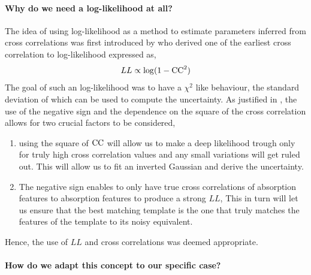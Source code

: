 \paragraph{Why do we need a log-likelihood at all?\\}
The idea of using log-likelihood as a method to estimate parameters inferred from cross correlations was first introduced by \cite{2003Zucker} who derived one of the earliest cross correlation to log-likelihood expressed as,
\begin{equation}
    LL \propto \log(1-\rm{CC}^2)
    \label{eq:LL-cc eqn}
\end{equation}
The goal of such an log-likelihood was to have a $\chi^2$ like behaviour, the standard deviation of which can be used to compute the uncertainty.
As justified in \cite{2019Brogi}, the use of the negative sign and the dependence on the square of the cross correlation allows for two crucial factors to be considered,
\begin{enumerate}
\item using the square of $\rm{CC}$ will allow us to make a deep likelihood trough only for truly high cross correlation values and any small variations will get ruled out.
This will allow us to fit an inverted Gaussian and derive the uncertainty.
\item The negative sign enables to only have true cross correlations of absorption features to absorption features to produce a strong $LL$,
This in turn will let us ensure that the best matching template is the one that truly matches the features of the template to its noisy equivalent.
    \end{enumerate}
Hence, the use of $LL$ and cross correlations was deemed appropriate.

\paragraph{How do we adapt this concept to our specific case?\\}

